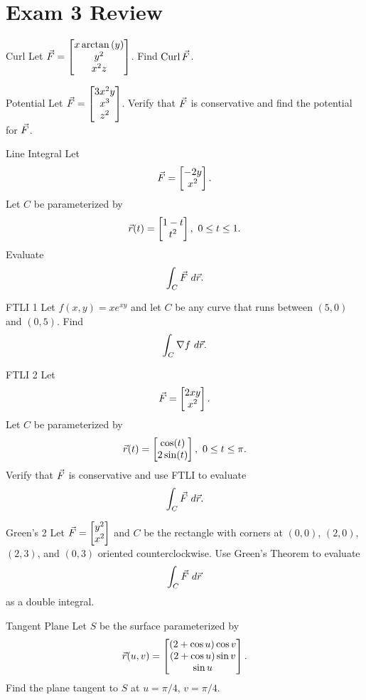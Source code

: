 \section*{Exam 3 Review}
\setcounter{counter}{0}

\begin{revex}{Curl}
Let $\vec{F}=\begin{bmatrix}x\arctan{(y)}\\y^2\\x^2z\end{bmatrix}$. Find $\operatorname{Curl}\vec{F}$.
\end{revex}

\begin{revex}{Potential}
Let $\vec{F}=\begin{bmatrix}3x^2y\\x^3\\z^2\end{bmatrix}$. Verify that $\vec{F}$ is conservative and find the potential for $\vec{F}$.
\end{revex}

\begin{revex}{Line Integral}
Let $$\vec{F}=\begin{bmatrix}-2y\\x^2\end{bmatrix}.$$ Let $C$ be parameterized by $$\vec{r}(t)=\begin{bmatrix}1-t\\t^2\end{bmatrix},\ 0\leq t\leq 1. $$
Evaluate $$\int_C \vec{F} \ d\vec{r}.$$
\end{revex}

\begin{revex}{FTLI 1}
Let $f(x,y)=xe^{xy}$ and let $C$ be any curve that runs between $(5,0)$ and $(0,5)$. Find $$\int_C \nabla f \ d\vec{r}. $$ 
\end{revex}

\begin{revex}{FTLI 2}
Let $$\vec{F}=\begin{bmatrix}2xy\\x^2\end{bmatrix}. $$ Let $C$ be parameterized by $$\vec{r}(t)=\begin{bmatrix}\cos(t)\\ 2\sin(t)\end{bmatrix},\ 0\leq t \leq \pi .$$
Verify that $\vec{F}$ is conservative and use FTLI to evaluate $$\int_C \vec{F} \ d\vec{r}. $$
\end{revex}

\begin{revex}{Green's 2}
Let $\vec{F}=\begin{bmatrix}y^2\\x^2\end{bmatrix}$ and $C$ be the rectangle with corners at $(0,0) $, $(2,0) $, $(2,3) $, and $(0,3) $ oriented counterclockwise. Use Green's Theorem to evaluate $$\int_C \vec{F} \ d\vec{r} $$ as a double integral.
\end{revex}

\begin{revex}{Tangent Plane}
Let $S$ be the surface parameterized by $$\vec{r}(u,v)=\begin{bmatrix}(2+\cos u)\cos v\\(2+\cos u)\sin v\\ \sin u\end{bmatrix} .$$ Find the plane tangent to $S$ at $u=\pi/4$, $v=\pi/4$.
\end{revex}

